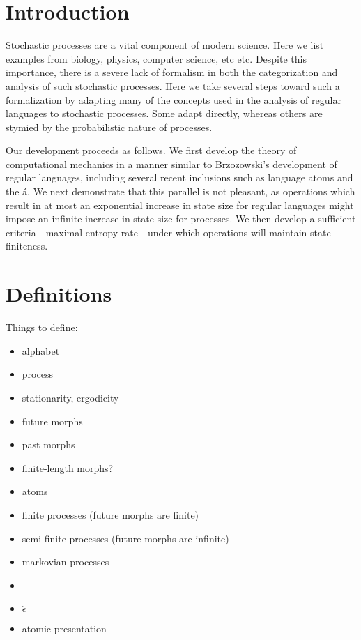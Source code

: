 \documentclass[prl,twocolumn,showpacs,superscriptaddress,preprintnumbers,floatfix]{revtex4-1}
\newcommand{\etomata}{\ensuremath{\acute{\epsilon}}\text{tomata}\xspace}
\newcommand{\atomata}{{\'a}\text{tomata}\xspace}
\begin{document}

\title{\ourTitle}
\date{\today}
\maketitle
\tableofcontents




\section{Introduction}
\label{sec:introduction}

Stochastic processes are a vital component of modern science. Here we list examples from biology, physics, computer science, etc etc. Despite this importance, there is a severe lack of formalism in both the categorization and analysis of such stochastic processes. Here we take several steps toward such a formalization by adapting many of the concepts used in the analysis of regular languages to stochastic processes. Some adapt directly, whereas others are stymied by the probabilistic nature of processes.

Our development proceeds as follows. We first develop the theory of computational mechanics in a manner similar to Brzozowski's development of regular languages, including several recent inclusions such as language atoms and the \atomata. We next demonstrate that this parallel is not pleasant, as operations which result in at most an exponential increase in state size for regular languages might impose an infinite increase in state size for processes. We then develop a sufficient criteria---maximal entropy rate---under which operations will maintain state finiteness.

\section{Definitions}
\label{sec:definitions}

Things to define:
\begin{itemize}
  \item alphabet
  \item process
  \item stationarity, ergodicity
  \item future morphs
  \item past morphs
  \item finite-length morphs?
  \item atoms
  \item finite processes (future morphs are finite)
  \item semi-finite processes (future morphs are infinite)
  \item markovian processes
  \item \eM
  \item \etomata
  \item atomic presentation
\end{itemize}
\end{document}
